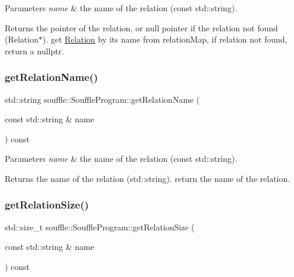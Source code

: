 \begin{DoxyParams}{Parameters}
{\em name} & the name of the relation (const std\+::string). \\
\hline
\end{DoxyParams}
\begin{DoxyReturn}{Returns}
the pointer of the relation, or null pointer if the relation not found (Relation$\ast$). get \hyperlink{classsouffle_1_1_relation}{Relation} by its name from relation\+Map, if relation not found, return a nullptr. 
\end{DoxyReturn}
\mbox{\label{classsouffle_1_1_souffle_program_a1aef3ec37477cc54a5ba982d5aaf6ffc}} 
\subsubsection{\texorpdfstring{get\+Relation\+Name()}{getRelationName()}}
{\footnotesize\ttfamily std\+::string souffle\+::\+Souffle\+Program\+::get\+Relation\+Name (\begin{DoxyParamCaption}\item[{const std\+::string \&}]{name }\end{DoxyParamCaption}) const\hspace{0.3cm}{\ttfamily [inline]}}


\begin{DoxyParams}{Parameters}
{\em name} & the name of the relation (const std\+::string). \\
\hline
\end{DoxyParams}
\begin{DoxyReturn}{Returns}
the name of the relation (std\+::string). return the name of the relation. 
\end{DoxyReturn}
\mbox{\label{classsouffle_1_1_souffle_program_a729cb758eeef2b2443791d8cd97a5ef2}} 
\subsubsection{\texorpdfstring{get\+Relation\+Size()}{getRelationSize()}}
{\footnotesize\ttfamily std\+::size\+\_\+t souffle\+::\+Souffle\+Program\+::get\+Relation\+Size (\begin{DoxyParamCaption}\item[{const std\+::string \&}]{name }\end{DoxyParamCaption}) const\hspace{0.3cm}{\ttfamily [inline]}}


